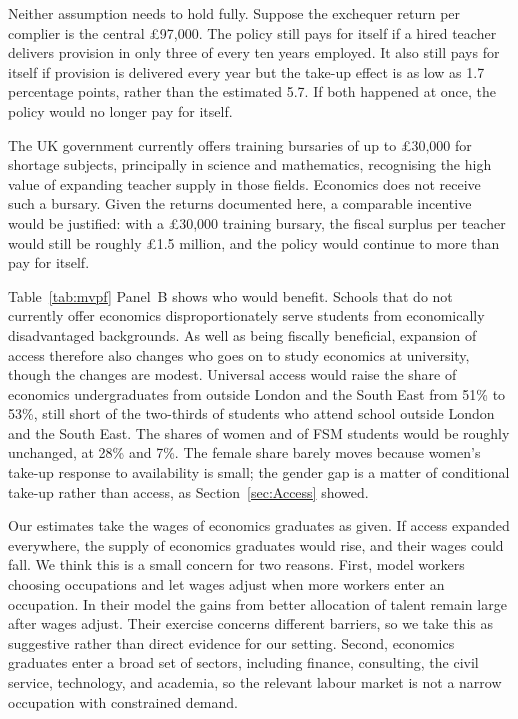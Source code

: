 Neither assumption needs to hold fully. Suppose the exchequer return per complier is the central \pounds 97,000. The policy still pays for itself if a hired teacher delivers provision in only three of every ten years employed. It also still pays for itself if provision is delivered every year but the take-up effect is as low as 1.7 percentage points, rather than the estimated 5.7. If both happened at once, the policy would no longer pay for itself.

The UK government currently offers training bursaries of up to \pounds 30,000 for shortage subjects, principally in science and mathematics, recognising the high value of expanding teacher supply in those fields. Economics does not receive such a bursary. Given the returns documented here, a comparable incentive would be justified: with a \pounds 30,000 training bursary, the fiscal surplus per teacher would still be roughly \pounds 1.5 million,
and the policy would continue to more than pay for itself.



Table~\ref{tab:mvpf} Panel~B shows who would benefit. Schools that do not currently offer economics disproportionately serve students from economically disadvantaged backgrounds. As well as being fiscally beneficial, expansion of access therefore also changes who goes on to study economics at university, though the changes are modest. Universal access would raise the share of economics undergraduates from outside London and the South East from 51\% to 53\%, still short of the two-thirds of students who attend school outside London and the South East. The shares of women and of FSM students would be roughly unchanged, at 28\% and 7\%. The female share barely moves because women's take-up response to availability is small; the gender gap is a matter of conditional take-up rather than access, as Section~\ref{sec:Access} showed.


Our estimates take the wages of economics graduates as given. If access expanded everywhere, the supply of economics graduates would rise, and their wages could fall. We think this is a small concern for two reasons. First, \citet{hsieh2019allocation} model workers choosing occupations and let wages adjust when more workers enter an occupation. In their model the gains from better allocation of talent remain large after wages adjust. Their exercise concerns different barriers, so we take this as suggestive rather than direct evidence for our setting. Second, economics graduates enter a broad set of sectors, including finance, consulting, the civil service, technology, and academia, so the relevant labour market is not a narrow occupation with constrained demand.

